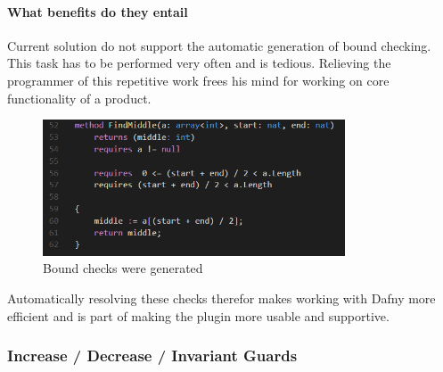 \paragraph{What benefits do they entail}
Current solution do not support the automatic generation of bound checking. This task has to be performed very often and is tedious. Relieving the programmer of this repetitive work frees his mind for working on core functionality of a product. \newline
\begin{figure}[H]
	\centering
	\includegraphics[width=0.8\textwidth]{img/boundCheck}
	\caption{Bound checks were generated}
	\label{fig:dfindexInBound}
\end{figure}
Automatically resolving these checks therefor makes working with Dafny more efficient and is part of making the plugin more usable and supportive.
\subsubsection{Increase / Decrease / Invariant Guards}
